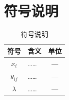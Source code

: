 \section{符号说明}


\begin{table}[htbp]
  \centering
  \caption{符号说明}
  \label{tab:symbols}
  \begin{tabular}{clc}
    \toprule
    符号 & 含义 & 单位 \\
    \midrule
    $x_i$    & …… & —   \\
    $y_{ij}$ & …… & —   \\
    $\lambda$ & …… & —  \\
    \bottomrule
  \end{tabular}
\end{table}
